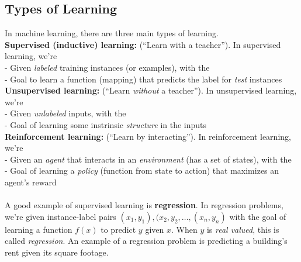 \documentclass[11 pt]{scrartcl}
\begin{document}
\subsection{Types of Learning}
In machine learning, there are three main types of learning. \\
\textbf{Supervised (inductive) learning:} (``Learn with a teacher''). In supervised learning, we're \\
- Given \textit{labeled} training instances (or examples), with the \\
- Goal to learn a function (mapping) that predicts the label for \textit{test} instances \\
\textbf{Unsupervised learning:} (``Learn \textit{without} a teacher''). In unsupervised learning, we're \\
- Given \textit{unlabeled} inputs, with the \\
- Goal of learning some instrinsic \textit{structure} in the inputs \\
\textbf{Reinforcement learning:} (``Learn by interacting''). In reinforcement learning, we're \\
- Given an \textit{agent} that interacts in an \textit{environment} (has a set of states), with the \\
- Goal of learning a \textit{policy} (function from state to action) that maximizes an agent's reward \\\\
A good example of supervised learning is \textbf{regression}. In regression problems, we're given instance-label pairs $(x_1, y_1), (x_2, y_2, \ldots, (x_n, y_n)$ with the goal of learning a function $f(x)$ to predict $y$ given $x$. When $y$ is \textit{real valued}, this is called \textit{regression}. An example of a regression problem is predicting a building's rent given its square footage. \\
\end{document}
